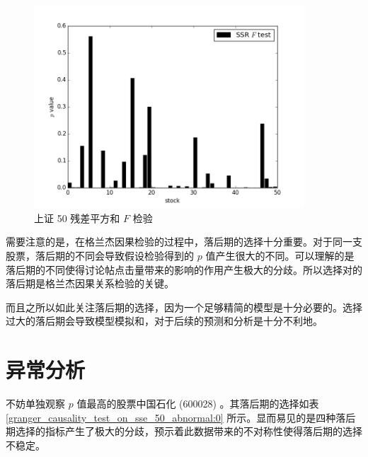 \begin{figure}
  \centering
  \includegraphics[width=0.9\textwidth]{plots/granger_causality_test_on_sse_50_ssr_ftest.png}
  \caption{上证 50 残差平方和 $F$ 检验}
  \label{f_test:15}
\end{figure}

需要注意的是，在格兰杰因果检验的过程中，落后期的选择十分重要。对于同一支股票，落后期的不同会导致假设检验得到的 $p$ 值产生很大的不同。可以理解的是落后期的不同使得讨论帖点击量带来的影响的作用产生极大的分歧。所以选择对的落后期是格兰杰因果关系检验的关键。

而且之所以如此关注落后期的选择，因为一个足够精简的模型是十分必要的。选择过大的落后期会导致模型模拟和，对于后续的预测和分析是十分不利地。

\section{异常分析}

不妨单独观察 $p$ 值最高的股票中国石化 (600028) 。其落后期的选择如表 \ref{granger_causality_test_on_sse_50_abnormal:0} 所示。显而易见的是四种落后期选择的指标产生了极大的分歧，预示着此数据带来的不对称性使得落后期的选择不稳定。

